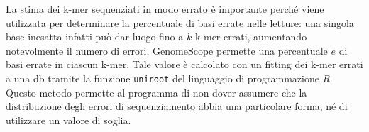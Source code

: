 \documentclass[crop=false, class=book]{standalone}
\begin{document}
	La stima dei k-mer sequenziati in modo errato è importante perché viene utilizzata per determinare la percentuale di basi errate nelle letture: una singola base inesatta infatti può dar luogo fino a $k$ k-mer errati, aumentando notevolmente il numero di errori. GenomeScope permette una percentuale $e$ di basi errate in ciascun k-mer. Tale valore è calcolato con un \gls{fitting} dei k-mer errati a una \gls{db} tramite la funzione \verb|uniroot| del linguaggio di programmazione \textit{R}. Questo metodo permette al programma di non dover assumere che la distribuzione degli errori di sequenziamento abbia una particolare forma, né di utilizzare un valore di soglia.
	
\end{document}
